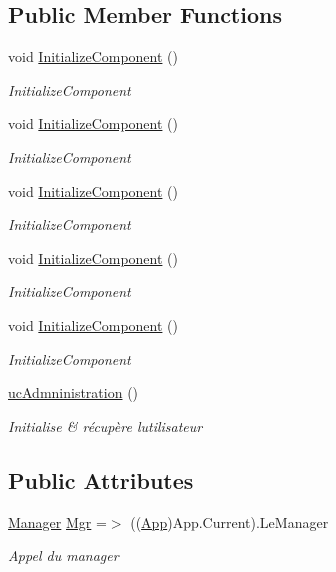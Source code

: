 \subsection*{Public Member Functions}
\begin{DoxyCompactItemize}
\item 
void \hyperlink{classnewPizza1_1_1ucAdmninistration_a500966f5d66cf50194a823a88df8517e}{Initialize\+Component} ()
\begin{DoxyCompactList}\small\item\em Initialize\+Component \end{DoxyCompactList}\item 
void \hyperlink{classnewPizza1_1_1ucAdmninistration_a500966f5d66cf50194a823a88df8517e}{Initialize\+Component} ()
\begin{DoxyCompactList}\small\item\em Initialize\+Component \end{DoxyCompactList}\item 
void \hyperlink{classnewPizza1_1_1ucAdmninistration_a500966f5d66cf50194a823a88df8517e}{Initialize\+Component} ()
\begin{DoxyCompactList}\small\item\em Initialize\+Component \end{DoxyCompactList}\item 
void \hyperlink{classnewPizza1_1_1ucAdmninistration_a500966f5d66cf50194a823a88df8517e}{Initialize\+Component} ()
\begin{DoxyCompactList}\small\item\em Initialize\+Component \end{DoxyCompactList}\item 
void \hyperlink{classnewPizza1_1_1ucAdmninistration_a500966f5d66cf50194a823a88df8517e}{Initialize\+Component} ()
\begin{DoxyCompactList}\small\item\em Initialize\+Component \end{DoxyCompactList}\item 
\hyperlink{classnewPizza1_1_1ucAdmninistration_affb0f76e62a39bc80006086513f73825}{uc\+Admninistration} ()
\begin{DoxyCompactList}\small\item\em Initialise \& récupère l\textquotesingle{}utilisateur \end{DoxyCompactList}\end{DoxyCompactItemize}
\subsection*{Public Attributes}
\begin{DoxyCompactItemize}
\item 
\hyperlink{classModele_1_1Manager}{Manager} \hyperlink{classnewPizza1_1_1ucAdmninistration_a74229d73a1ccb7500c882d4425c05753}{Mgr} =$>$ ((\hyperlink{classnewPizza1_1_1App}{App})App.\+Current).Le\+Manager
\begin{DoxyCompactList}\small\item\em Appel du manager \end{DoxyCompactList}\end{DoxyCompactItemize}


